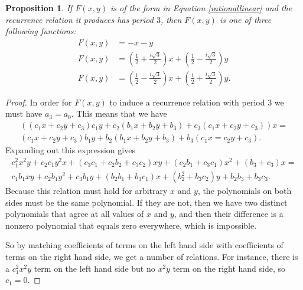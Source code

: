 \documentclass[12pt]{article}
\newtheorem{proposition}{Proposition}
\begin{document}
\begin{proposition} 
If $F(x,y)$ is of the form in Equation \ref{rationallinear} and the recurrence relation it produces has period $3$, then $F(x,y)$ is one of three following functions:
\begin{align*}
F(x,y) &= -x-y \\
F(x,y) &= \left( \frac{1}{2} +\frac{i\sqrt{3}}{2} \right) x + \left( \frac{1}{2} -\frac{i\sqrt{3}}{2} \right) y \\
F(x,y) &= \left( \frac{1}{2} -\frac{i\sqrt{3}}{2} \right) x + \left( \frac{1}{2} +\frac{i\sqrt{3}}{2} \right) y.
\end{align*}
\end{proposition}
\begin{proof}
In order for $F(x,y)$ to induce a recurrence relation with period $3$ we must have $a_3=a_0$. This means that we have
\begin{align*}
\left( (c_1 x + c_2 y +c_3) c_1 y + c_2 (b_1 x + b_2 y + b_3) + c_3(c_1 x + c_2 y +c_3) \right) x = \\(c_1 x + c_2 y + c_3) b_1 y + b_2(b_1 x + b_2 y + b_3) + b_3 (c_1 x = c_2 y + c_3).
\end{align*}
Expanding out this expression gives
\begin{align*}
c_1^2 x^2 y + c_2 c_1 y^2 x + (c_3 c_1 + c_2 b_2 + c_3 c_2)xy + (c_2b_1 + c_3 c_1) x^2 + (b_3 + c_3)x = \\ c_1 b_1 xy + c_2 b_1 y^2 + c_3 b_1 y + (b_2 b_1 + b_3 c_1)x + (b_2^2 +b_3 c_2)y + b_2 b_3 + b_3 c_3.
\end{align*}
Because this relation must hold for arbitrary $x$ and $y$, the polynomials on both sides must be the same polynomial. If they are not, then we have two distinct polynomials that agree at all values of $x$ and $y$, and then their difference is a nonzero polynomial that equals zero everywhere, which is impossible.

So by matching coefficients of terms on the left hand side with coefficients of terms on the right hand side, we get a number of relations. For instance, there is a $c_1^2 x^2 y$ term on the left hand side but no $x^2y$ term on the right hand side, so $c_1 = 0$.


\end{proof}
\end{document}
